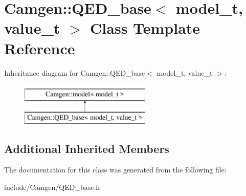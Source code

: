 \hypertarget{a00452}{\section{Camgen\-:\-:Q\-E\-D\-\_\-base$<$ model\-\_\-t, value\-\_\-t $>$ Class Template Reference}
\label{a00452}
}
Inheritance diagram for Camgen\-:\-:Q\-E\-D\-\_\-base$<$ model\-\_\-t, value\-\_\-t $>$\-:\begin{figure}[H]
\begin{center}
\leavevmode
\includegraphics[height=2.000000cm]{a00452}
\end{center}
\end{figure}
\subsection*{Additional Inherited Members}


The documentation for this class was generated from the following file\-:\begin{DoxyCompactItemize}
\item 
include/\-Camgen/Q\-E\-D\-\_\-base.\-h\end{DoxyCompactItemize}
